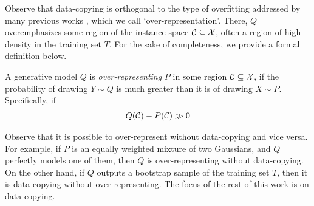 Observe that data-copying is orthogonal to the type of overfitting addressed by many previous works \citep{heusel, mehdi}, which we call `over-representation'. There, $Q$ overemphasizes some region of the instance space $\mathcal{C} \subseteq \mathcal{X}$, often a region of high density in the training set $T$. For the sake of completeness, we provide a formal definition below.


\begin{definition}
    A generative model $Q$ is \textit{over-representing} $P$ in some region $\mathcal{C} \subseteq \mathcal{X}$, if the probability of drawing $Y \sim Q$ is much greater than it is of drawing $X \sim P$. Specifically, if 
    \begin{align*}
        Q(\mathcal{C}) - P(\mathcal{C}) \gg 0 
    \end{align*}
\end{definition}

Observe that it is possible to over-represent without data-copying and vice versa. For example, if $P$ is an equally weighted mixture of two Gaussians, and $Q$ perfectly models one of them, then $Q$ is over-representing without data-copying. On the other hand, if $Q$ outputs a bootstrap sample of the training set $T$, then it is data-copying without over-representing. The focus of the rest of this work is on data-copying.  